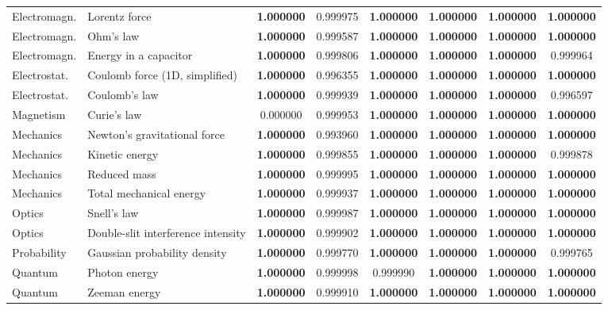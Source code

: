 \documentclass[twoside,11pt]{article}
\begin{document}
{\begin{longtable}{p{1.9cm}p{4.3cm}cccccc}
Electromagn. & Lorentz force & \textbf{1.000000} & 0.999975 & \textbf{1.000000} & \textbf{1.000000} & \textbf{1.000000} & \textbf{1.000000} \\
Electromagn. & Ohm's law & \textbf{1.000000} & 0.999587 & \textbf{1.000000} & \textbf{1.000000} & \textbf{1.000000} & \textbf{1.000000} \\
Electromagn. & Energy in a capacitor & \textbf{1.000000} & 0.999806 & \textbf{1.000000} & \textbf{1.000000} & \textbf{1.000000} & 0.999964 \\
Electrostat. & Coulomb force (1D, simplified) & \textbf{1.000000} & 0.996355 & \textbf{1.000000} & \textbf{1.000000} & \textbf{1.000000} & \textbf{1.000000} \\
Electrostat. & Coulomb's law & \textbf{1.000000} & 0.999939 & \textbf{1.000000} & \textbf{1.000000} & \textbf{1.000000} & 0.996597 \\
Magnetism & Curie's law & 0.000000 & 0.999953 & \textbf{1.000000} & \textbf{1.000000} & \textbf{1.000000} & \textbf{1.000000} \\
Mechanics & Newton's gravitational force & \textbf{1.000000} & 0.993960 & \textbf{1.000000} & \textbf{1.000000} & \textbf{1.000000} & \textbf{1.000000} \\
Mechanics & Kinetic energy & \textbf{1.000000} & 0.999855 & \textbf{1.000000} & \textbf{1.000000} & \textbf{1.000000} & 0.999878 \\
Mechanics & Reduced mass & \textbf{1.000000} & 0.999995 & \textbf{1.000000} & \textbf{1.000000} & \textbf{1.000000} & \textbf{1.000000} \\
Mechanics & Total mechanical energy & \textbf{1.000000} & 0.999937 & \textbf{1.000000} & \textbf{1.000000} & \textbf{1.000000} & \textbf{1.000000} \\
Optics & Snell's law & \textbf{1.000000} & 0.999987 & \textbf{1.000000} & \textbf{1.000000} & \textbf{1.000000} & \textbf{1.000000} \\
Optics & Double-slit interference intensity & \textbf{1.000000} & 0.999902 & \textbf{1.000000} & \textbf{1.000000} & \textbf{1.000000} & \textbf{1.000000} \\
Probability & Gaussian probability density & \textbf{1.000000} & 0.999770 & \textbf{1.000000} & \textbf{1.000000} & \textbf{1.000000} & 0.999765 \\
Quantum & Photon energy & \textbf{1.000000} & 0.999998 & 0.999990 & \textbf{1.000000} & \textbf{1.000000} & \textbf{1.000000} \\
Quantum & Zeeman energy & \textbf{1.000000} & 0.999910 & \textbf{1.000000} & \textbf{1.000000} & \textbf{1.000000} & \textbf{1.000000} \\

\end{longtable}}
\end{document}
